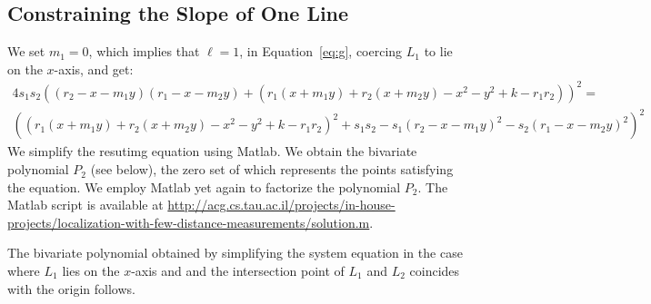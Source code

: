 \subsection{Constraining the Slope of One Line}
\label{ssec:derivation-constraining-slope}
We set $m_1 = 0$, which implies that $\ell = 1$, in
Equation~\ref{eq:g}, coercing $L_1$ to lie on the $x$-axis, and get:
\begin{multline*}
  4 s_1 s_2 ((r_2 - x - m_1 y) (r_1 - x - m_2 y) + (r_1 (x + m_1 y) + r_2 (x + m_2 y) - x^2 - y^2 + k - r_1 r_2))^2 =\\
  ((r_1 (x + m_1 y) + r_2 (x + m_2 y) - x^2 - y^2 + k - r_1 r_2)^2 + s_1 s_2 -
    s_1 (r_2 - x - m_1 y)^2 - s_2 (r_1 - x - m_2 y)^2)^2
\end{multline*}
We simplify the resutimg equation using Matlab. We obtain the
bivariate polynomial $P_2$ (see below), the zero set of which
represents the points satisfying the equation. We employ Matlab yet
again to factorize the polynomial $P_2$. The Matlab script is
available at
\url{http://acg.cs.tau.ac.il/projects/in-house-projects/localization-with-few-distance-measurements/solution.m}.

The bivariate polynomial obtained by simplifying the system equation
in the case where $L_1$ lies on the $x$-axis and and the intersection
point of $L_1$ and $L_2$ coincides with the origin follows.

